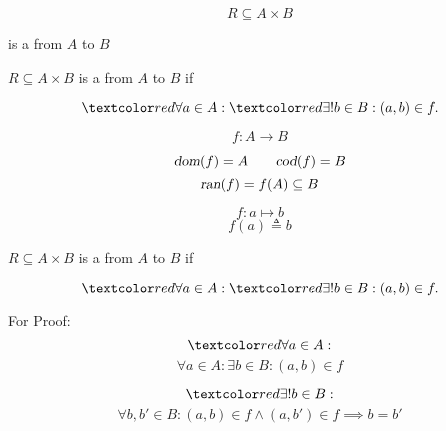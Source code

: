 
\begin{frame}{}
  \begin{center}
  \end{center}
\end{frame}

\begin{frame}{}
  \[
    R \subseteq A \times B
  \]

  \begin{center}
    is a  from $A$ to $B$
  \end{center}
\end{frame}

\begin{frame}{}
  \begin{definition}[Function]
    $R \subseteq A \times B$ is a  from $A$ to $B$ if

    \[
      \red{\forall} a \in A: \red{\exists!} b \in B: (a, b) \in f.
    \]
  \end{definition}

  \pause
  \[
    f: A \to B 
  \]

  \pause
  \[
    \textsl{dom}(f) = A \qquad \textsl{cod}(f) = B
  \]
  \[
    \textsl{ran}(f) = f(A) \subseteq B
  \]

  \pause
  \[
    f: a \mapsto b
  \]
  \[
    f(a) \triangleq b
  \]
\end{frame}

\begin{frame}{}
  \begin{definition}[Function]
    $R \subseteq A \times B$ is a  from $A$ to $B$ if

    \[
      \red{\forall} a \in A: \red{\exists!} b \in B: (a, b) \in f.
    \]
  \end{definition}

  \begin{alertblock}{For Proof:}
    \pause
    \[
      \red{\forall a \in A:}
    \]
    \[
      \forall a \in A: \exists b \in B: (a, b) \in f
    \]

    \pause
    \[
      \red{\exists! b \in B:}
    \]
    \[
      \forall b, b' \in B: (a, b) \in f \land (a, b') \in f \implies b = b'
    \]
  \end{alertblock}
\end{frame}

